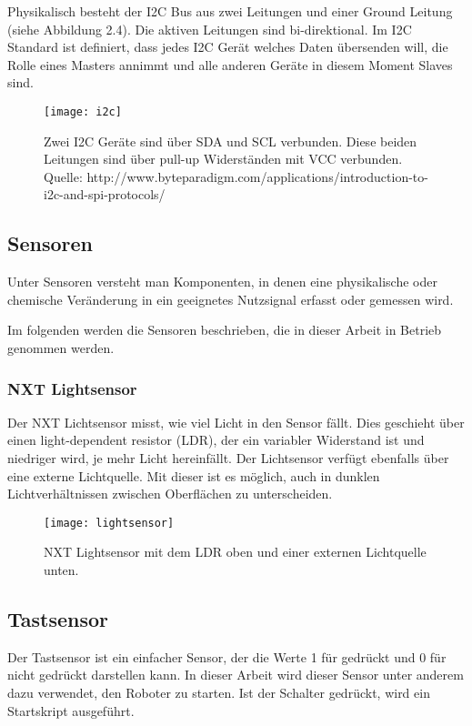 Physikalisch besteht der I2C Bus aus zwei Leitungen und einer Ground Leitung (siehe Abbildung 2.4). Die aktiven Leitungen sind bi-direktional. Im I2C Standard ist definiert, dass jedes I2C Gerät welches Daten übersenden will, die Rolle eines Masters annimmt und alle anderen Geräte in diesem Moment Slaves sind.

\begin{figure}[h]
  \centering
  \texttt{[image: i2c]}
  \caption{Zwei I2C Geräte sind über SDA und SCL verbunden. Diese beiden Leitungen sind über pull-up Widerständen mit VCC verbunden. Quelle: http://www.byteparadigm.com/applications/introduction-to-i2c-and-spi-protocols/}
  \label{Kap1:I2C}
\end{figure}

\clearpage

\subsection{Sensoren}
Unter Sensoren versteht man Komponenten, in denen eine physikalische oder chemische Veränderung in ein geeignetes Nutzsignal erfasst oder gemessen wird.

Im folgenden werden die Sensoren beschrieben, die in dieser Arbeit in Betrieb genommen werden.

\subsubsection{NXT Lightsensor}
Der NXT Lichtsensor misst, wie viel Licht  in den Sensor fällt. Dies geschieht über einen light-dependent resistor (LDR), der ein variabler Widerstand ist und niedriger wird, je mehr Licht hereinfällt. Der Lichtsensor verfügt ebenfalls über eine externe Lichtquelle. Mit dieser ist es möglich, auch in dunklen Lichtverhältnissen zwischen Oberflächen zu unterscheiden.

\begin{figure}[h]
  \centering
  \texttt{[image: lightsensor]}
  \caption{NXT Lightsensor mit dem LDR oben und einer externen Lichtquelle unten.}
  \label{Kap1:Lightsensor}
\end{figure}

\subsection{Tastsensor}

Der Tastsensor ist ein einfacher Sensor, der die Werte 1 für gedrückt und 0 für nicht gedrückt darstellen kann. In dieser Arbeit wird dieser Sensor unter anderem dazu verwendet, den Roboter zu starten. Ist der Schalter gedrückt, wird ein Startskript ausgeführt.

